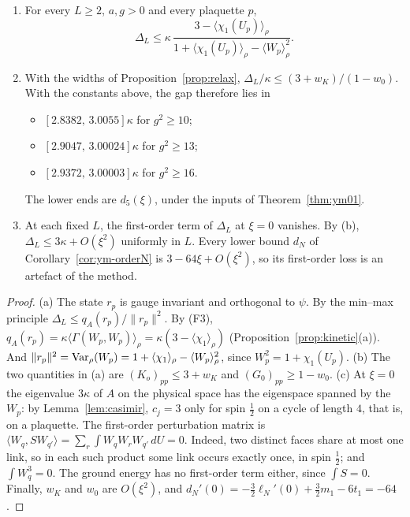 \begin{proposition}\label{prop:gapupper}
\begin{enumerate}[label=(\alph*)]
\item For every $L\ge2$, $a,g>0$ and every plaquette $p$,
\[
\Delta_L\le\kappa\,\frac{3-\langle\chi_1(U_p)\rangle_\rho}{1+\langle\chi_1(U_p)\rangle_\rho-\langle W_p\rangle_\rho^2}.
\]
\item With the widths of Proposition~\ref{prop:relax}, $\Delta_L/\kappa\le(3+w_K)/(1-w_0)$. With the constants above, the gap therefore lies in
\begin{itemize}
\item $[2.8382,\,3.0055]\kappa$ for $g^2\ge10$;
\item $[2.9047,\,3.00024]\kappa$ for $g^2\ge13$;
\item $[2.9372,\,3.00003]\kappa$ for $g^2\ge16$.
\end{itemize}
The lower ends are $d_5(\xi)$, under the inputs of Theorem~\ref{thm:ym01}.
\item At each fixed $L$, the first-order term of $\Delta_L$ at $\xi=0$ vanishes. By (b), $\Delta_L\le3\kappa+O(\xi^2)$ uniformly in $L$. Every lower bound $d_N$ of Corollary~\ref{cor:ym-orderN} is $3-64\xi+O(\xi^2)$, so its first-order loss is an artefact of the method.
\end{enumerate}
\end{proposition}
\begin{proof}
(a) The state $r_p$ is gauge invariant and orthogonal to $\psi$. By the min--max principle $\Delta_L\le q_A(r_p)/\|r_p\|^2$. By (F3), $q_A(r_p)=\kappa\langle\Gamma(W_p,W_p)\rangle_\rho=\kappa(3-\langle\chi_1\rangle_\rho)$ (Proposition~\ref{prop:kinetic}(a)). And $\|r_p\|^2=\operatorname{Var}_\rho(W_p)=1+\langle\chi_1\rangle_\rho-\langle W_p\rangle_\rho^2$, since $W_p^2=1+\chi_1(U_p)$.
(b) The two quantities in (a) are $(K_o)_{pp}\le3+w_K$ and $(G_0)_{pp}\ge1-w_0$.
(c) At $\xi=0$ the eigenvalue $3\kappa$ of $A$ on the physical space has the eigenspace spanned by the $W_p$: by Lemma~\ref{lem:casimir}, $c_j=3$ only for spin $\frac12$ on a cycle of length $4$, that is, on a plaquette. The first-order perturbation matrix is $\langle W_q,SW_{q'}\rangle=\sum_r\int W_qW_rW_{q'}\,dU=0$. Indeed, two distinct faces share at most one link, so in each such product some link occurs exactly once, in spin $\frac12$; and $\int W_q^3=0$. The ground energy has no first-order term either, since $\int S=0$. Finally, $w_K$ and $w_0$ are $O(\xi^2)$, and $d_N'(0)=-\frac32\ell_N'(0)+\frac32m_1-6t_1=-64$.
\end{proof}

